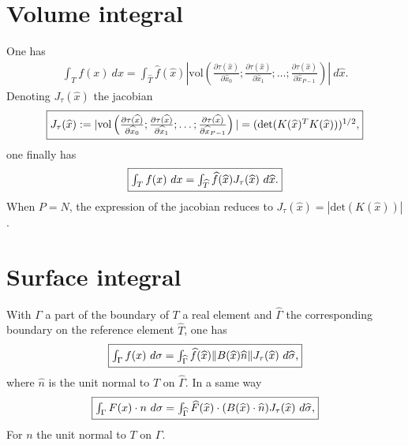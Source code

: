 \documentclass[a4paper,11pt,english]{sphinxmanual}
\begin{document}
\section{Volume integral}
\label{\detokenize{project/appendixA:volume-integral}}
One has
\begin{equation*}
\begin{split}\int_T f(x)\ dx = \int_{\widehat{T}} \widehat{f}(\widehat{x})
|\mbox{vol}\left(
\frac{\partial\tau(\widehat{x})}{\partial \widehat{x}_0};
\frac{\partial\tau(\widehat{x})}{\partial \widehat{x}_1};
\ldots;
\frac{\partial\tau(\widehat{x})}{\partial \widehat{x}_{P-1}}
\right)|\ d\widehat{x}.\end{split}
\end{equation*}
Denoting \(J_{\tau}(\widehat{x})\) the jacobian
\begin{equation*}
\begin{split}\fbox{$ J_{\tau}(\widehat{x}) :=
|\mbox{vol}\left(
\frac{\partial\tau(\widehat{x})}{\partial \widehat{x}_0};
\frac{\partial\tau(\widehat{x})}{\partial \widehat{x}_1};
\ldots;
\frac{\partial\tau(\widehat{x})}{\partial \widehat{x}_{P-1}}
\right)| =
(\mbox{det}(K(\widehat{x})^T K(\widehat{x})))^{1/2}$,}\end{split}
\end{equation*}
one finally has
\begin{equation*}
\begin{split}\fbox{$\int_T f(x)\ dx = \int_{\widehat{T}} \widehat{f}(\widehat{x}) J_{\tau}(\widehat{x})\ d\widehat{x}$.}\end{split}
\end{equation*}
When \(P = N\), the expression of the jacobian reduces to \(J_{\tau}(\widehat{x})
= |\mbox{det}(K(\widehat{x}))|\).


\section{Surface integral}
\label{\detokenize{project/appendixA:surface-integral}}
With \(\Gamma\) a part of the boundary of \(T\) a real element and
\(\widehat{\Gamma}\) the corresponding boundary on the reference element \(\widehat{T}\),
one has
\begin{equation*}
\begin{split}\fbox{$\int_{\Gamma} f(x)\ d\sigma =
\int_{\widehat{\Gamma}}\widehat{f}(\widehat{x}) \|B(\widehat{x})\widehat{n}\| J_{\tau}(\widehat{x})\ d\widehat{\sigma}$,}\end{split}
\end{equation*}
where \(\widehat{n}\) is the unit normal to \(\widehat{T}\) on \(\widehat{\Gamma}\). In a same
way
\begin{equation*}
\begin{split}\fbox{$\int_{\Gamma} F(x)\cdot n\ d\sigma =
\int_{\widehat{\Gamma}} \widehat{F}(\widehat{x})\cdot(B(\widehat{x})\cdot\widehat{n}) J_{\tau}(\widehat{x})\ d\widehat{\sigma}$,}\end{split}
\end{equation*}
For \(n\) the unit normal to \(T\) on \(\Gamma\).
\end{document}
